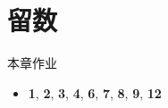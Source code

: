 \part{留数}


\begin{frame}{本章作业}
\begin{itemize}[<*>]
\item \textbf{1}, \textbf{2}, \textbf{3}, \textbf{4}, \textbf{6}, \textbf{7}, \textbf{8}, \textbf{9}, \textbf{12}
\end{itemize}
\end{frame}
